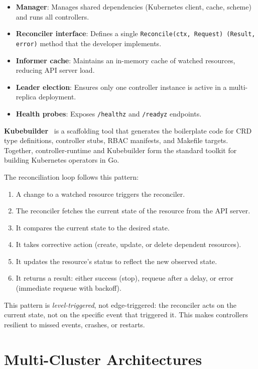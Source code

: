 \begin{itemize}
    \item \textbf{Manager}: Manages shared dependencies (Kubernetes client, cache, scheme) and runs all controllers.
    \item \textbf{Reconciler interface}: Defines a single \texttt{Reconcile(ctx, Request) (Result, error)} method that the developer implements.
    \item \textbf{Informer cache}: Maintains an in-memory cache of watched resources, reducing API server load.
    \item \textbf{Leader election}: Ensures only one controller instance is active in a multi-replica deployment.
    \item \textbf{Health probes}: Exposes \texttt{/healthz} and \texttt{/readyz} endpoints.
\end{itemize}

\textbf{Kubebuilder}~\cite{kubebuilder} is a scaffolding tool that generates the boilerplate code for CRD type definitions, controller stubs, RBAC manifests, and Makefile targets. Together, controller-runtime and Kubebuilder form the standard toolkit for building Kubernetes operators in Go.

The reconciliation loop follows this pattern:

\begin{enumerate}
    \item A change to a watched resource triggers the reconciler.
    \item The reconciler fetches the current state of the resource from the API server.
    \item It compares the current state to the desired state.
    \item It takes corrective action (create, update, or delete dependent resources).
    \item It updates the resource's status to reflect the new observed state.
    \item It returns a result: either success (stop), requeue after a delay, or error (immediate requeue with backoff).
\end{enumerate}

This pattern is \textit{level-triggered}, not edge-triggered: the reconciler acts on the current state, not on the specific event that triggered it. This makes controllers resilient to missed events, crashes, or restarts.


\section{Multi-Cluster Architectures}
\label{sec:multi-cluster}

